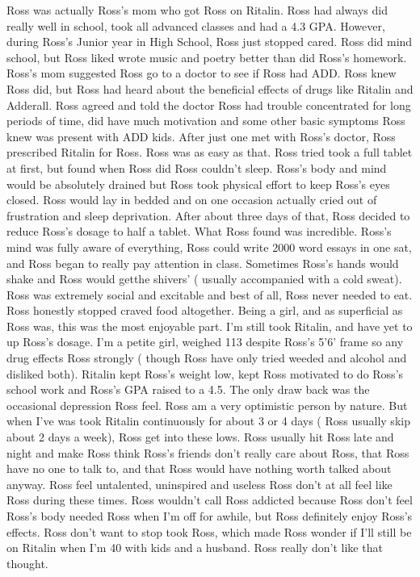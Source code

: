 \documentclass[12pt]{book}
\begin{document}
Ross was actually Ross's mom who got Ross on Ritalin. Ross had always did really well in school, took all advanced classes and had a 4.3 GPA. However, during Ross's Junior year in High School, Ross just stopped cared. Ross did mind school, but Ross liked wrote music and poetry better than did Ross's homework. Ross's mom suggested Ross go to a doctor to see if Ross had ADD. Ross knew Ross did, but Ross had heard about the beneficial effects of drugs like Ritalin and Adderall. Ross agreed and told the doctor Ross had trouble concentrated for long periods of time, did have much motivation and some other basic symptoms Ross knew was present with ADD kids. After just one met with Ross's doctor, Ross prescribed Ritalin for Ross. Ross was as easy as that. Ross tried took a full tablet at first, but found when Ross did Ross couldn't sleep. Ross's body and mind would be absolutely drained but Ross took physical effort to keep Ross's eyes closed. Ross would lay in bedded and on one occasion actually cried out of frustration and sleep deprivation. After about three days of that, Ross decided to reduce Ross's dosage to half a tablet. What Ross found was incredible. Ross's mind was fully aware of everything, Ross could write 2000 word essays in one sat, and Ross began to really pay attention in class. Sometimes Ross's hands would shake and Ross would getthe shivers' ( usually accompanied with a cold sweat). Ross was extremely social and excitable and best of all, Ross never needed to eat. Ross honestly stopped craved food altogether. Being a girl, and as superficial as Ross was, this was the most enjoyable part. I'm still took Ritalin, and have yet to up Ross's dosage. I'm a petite girl, weighed 113 despite Ross's 5'6' frame so any drug effects Ross strongly ( though Ross have only tried weeded and alcohol and disliked both). Ritalin kept Ross's weight low, kept Ross motivated to do Ross's school work and Ross's GPA raised to a 4.5. The only draw back was the occasional depression Ross feel. Ross am a very optimistic person by nature. But when I've was took Ritalin continuously for about 3 or 4 days ( Ross usually skip about 2 days a week), Ross get into these lows. Ross usually hit Ross late and night and make Ross think Ross's friends don't really care about Ross, that Ross have no one to talk to, and that Ross would have nothing worth talked about anyway. Ross feel untalented, uninspired and useless Ross don't at all feel like Ross during these times. Ross wouldn't call Ross addicted because Ross don't feel Ross's body needed Ross when I'm off for awhile, but Ross definitely enjoy Ross's effects. Ross don't want to stop took Ross, which made Ross wonder if I'll still be on Ritalin when I'm 40 with kids and a husband. Ross really don't like that thought.
\end{document}
